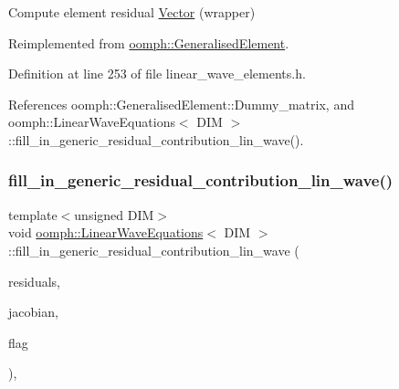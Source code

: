 Compute element residual \hyperlink{classoomph_1_1Vector}{Vector} (wrapper) 



Reimplemented from \hyperlink{classoomph_1_1GeneralisedElement_a310c97f515e8504a48179c0e72c550d7}{oomph\+::\+Generalised\+Element}.



Definition at line 253 of file linear\+\_\+wave\+\_\+elements.\+h.



References oomph\+::\+Generalised\+Element\+::\+Dummy\+\_\+matrix, and oomph\+::\+Linear\+Wave\+Equations$<$ D\+I\+M $>$\+::fill\+\_\+in\+\_\+generic\+\_\+residual\+\_\+contribution\+\_\+lin\+\_\+wave().

\mbox{\label{classoomph_1_1LinearWaveEquations_ae6017a229d5eccb3fb342e34a10382ec}} 
\subsubsection{\texorpdfstring{fill\+\_\+in\+\_\+generic\+\_\+residual\+\_\+contribution\+\_\+lin\+\_\+wave()}{fill\_in\_generic\_residual\_contribution\_lin\_wave()}}
{\footnotesize\ttfamily template$<$unsigned D\+IM$>$ \\
void \hyperlink{classoomph_1_1LinearWaveEquations}{oomph\+::\+Linear\+Wave\+Equations}$<$ D\+IM $>$\+::fill\+\_\+in\+\_\+generic\+\_\+residual\+\_\+contribution\+\_\+lin\+\_\+wave (\begin{DoxyParamCaption}\item[{\hyperlink{classoomph_1_1Vector}{Vector}$<$ double $>$ \&}]{residuals,  }\item[{\hyperlink{classoomph_1_1DenseMatrix}{Dense\+Matrix}$<$ double $>$ \&}]{jacobian,  }\item[{unsigned}]{flag }\end{DoxyParamCaption})\hspace{0.3cm}{\ttfamily [protected]}, {\ttfamily [virtual]}}



